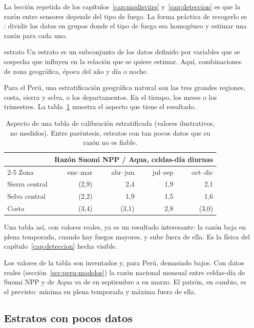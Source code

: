 La lección repetida de los capítulos~\ref{cap:modisviirs} y~\ref{cap:deteccion} es que la razón
entre sensores depende del tipo de fuego. La forma práctica de recogerlo es
: dividir los datos en grupos donde el tipo de fuego sea homogéneo y
estimar una razón para cada uno.

\begin{definicion}{estrato}
Un estrato es un subconjunto de los datos definido por variables que se sospecha que influyen en
la relación que se quiere estimar. Aquí, combinaciones de zona geográfica, época del año y día o
noche.
\end{definicion}

Para el Perú, una estratificación geográfica natural son las tres grandes regiones, costa,
sierra y selva, o los departamentos. En el tiempo, los meses o los trimestres. La
tabla~\ref{tab:estratos} muestra el aspecto que tiene el resultado.

\begin{table}[ht]
\centering
\begin{tabular}{lrrrr}
\toprule
 & \multicolumn{4}{c}{Razón Suomi NPP / Aqua, celdas-día diurnas} \\
\cmidrule{2-5}
Zona & ene--mar & abr--jun & jul--sep & oct--dic \\
\midrule
Sierra central & (2,9) & 2,4 & 1,9 & 2,1 \\
Selva central & (2,2) & 1,9 & 1,5 & 1,6 \\
Costa & (3,4) & (3,1) & 2,8 & (3,0) \\
\bottomrule
\end{tabular}
\caption{Aspecto de una tabla de calibración estratificada (valores ilustrativos, no medidos).
Entre paréntesis, estratos con tan pocos datos que su razón no es fiable.}
\label{tab:estratos}
\end{table}

Una tabla así, con valores reales, ya es un resultado interesante: la razón baja en plena
temporada, cuando hay fuegos mayores, y sube fuera de ella. Es la física del
capítulo~\ref{cap:deteccion} hecha visible.

Los valores de la tabla son inventados y, para Perú, demasiado bajos. Con datos reales
(sección~\ref{sec:peru-modelos}) la razón nacional mensual entre celdas-día de Suomi NPP y de
Aqua va de \PeruRazonMin{} en septiembre a \PeruRazonMax{} en marzo. El patrón, en cambio, es
el previsto: mínima en plena temporada y máxima fuera de ella.

\subsection{Estratos con pocos datos}

